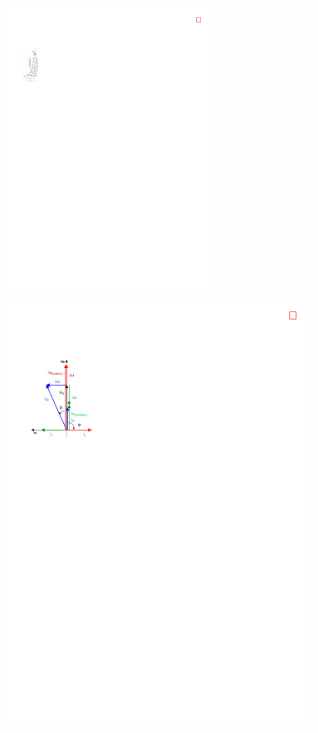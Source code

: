         \begin{minipage}[rt]{8cm}
        	\includegraphics[width=0.4\textwidth]{./images/SM_SC.pdf}
        	\label{SM_SC}
        	\includegraphics[width=0.6\textwidth]{./images/SM_load.pdf}
        	\label{SM_load}
        \end{minipage}
        
